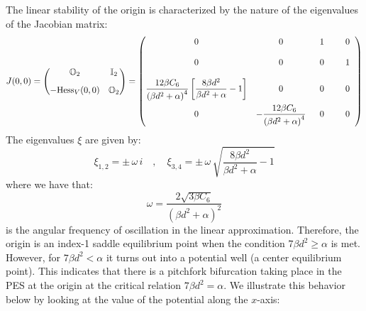 \documentclass[10pt,aps,onecolumn,superscriptaddress]{revtex4-2}
\begin{document}
The linear stability of the origin is characterized by the nature of the eigenvalues of the Jacobian matrix:
\begin{equation}
J(0,0) = \begin{pmatrix}
\mathbb{O}_2 & \mathbb{I}_2 \\[.3cm]
-\text{Hess}_{V}(0,0) & \mathbb{O}_2
\end{pmatrix} = \begin{pmatrix}
0 & 0 & \hspace{.2cm} 1 & \hspace{.5cm} 0 \hspace{.2cm} \\[.4cm]
0 & 0 & \hspace{.2cm} 0 & \hspace{.5cm} 1 \hspace{.2cm} \\[.4cm]
\dfrac{12 \beta C_6}{\left(\beta d^2 + \alpha\right)^4} \left[\dfrac{8\beta d^2}{\beta d^2 + \alpha} - 1\right] & 0 & \hspace{.2cm} 0 & \hspace{.5cm} 0 \hspace{.2cm} \\[.4cm]
0 & -\dfrac{12 \beta C_6}{\left(\beta d^2 + \alpha\right)^4} & \hspace{.2cm} 0 & \hspace{.5cm} 0 \hspace{.2cm} 
\end{pmatrix}
\end{equation}
The eigenvalues $\xi$ are given by:
\begin{equation}
\xi_{1,2} = \pm \, \omega \, i \quad,\quad \xi_{3,4} = \pm \, \omega \, \sqrt{\dfrac{8\beta d^2}{\beta d^2 + \alpha} - 1}
\end{equation}
where we have that:
\begin{equation}
\omega = \dfrac{2 \sqrt{3\beta C_6}}{\left(\beta d^2 + \alpha\right)^2}
\end{equation}
is the angular frequency of oscillation in the linear approximation. Therefore, the origin is an index-1 saddle equilibrium point when the condition $7\beta d^2 \geq \alpha$ is met. However, for $7\beta d^2 < \alpha$ it turns out into a potential well (a center equilibrium point). This indicates that there is a pitchfork bifurcation taking place in the PES at the origin at the critical relation $7\beta d^2 = \alpha$. We illustrate this behavior below by looking at the value of the potential along the $x$-axis:
\end{document}
